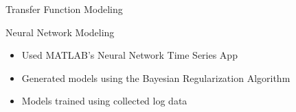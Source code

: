 \documentclass[final]{beamer}
\newlength{\onecolwid}
\begin{document}
\begin{frame}[t]
\begin{columns}[t]
\begin{column}{\onecolwid}
\begin{block}{Transfer Function Modeling}
\begin{itemize}
\end{itemize} 
\vskip -1cm

\end{block}


\begin{block}{Neural Network Modeling}
\vskip -1cm
\begin{itemize}
    \item Used MATLAB's Neural Network Time Series App
    \item Generated models using the Bayesian Regularization Algorithm
    \item Models trained using collected log data  
\end{itemize} 


\end{block}
\end{column}
\end{columns}
\end{frame}
\end{document}
